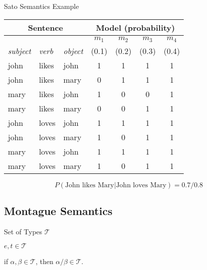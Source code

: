 \documentclass{beamer}
\newlength{\wideitemsep}
\let\olditem\item
\renewcommand{\item}{\setlength{\itemsep}{\wideitemsep}\olditem}
\begin{document}
\begin{frame}{Sato Semantics Example}
\begin{center}
\begin{tabular}{|l|l|l||c|c|c|c|}
\hline
\multicolumn{3}{|c||}{Sentence} & \multicolumn{4}{c|}{Model (probability)}\\
\hline
& & & $m_1$& $m_2$& $m_3$& $m_4$\\
\emph{subject} & \emph{verb} & \emph{object} & (0.1)& (0.2)& (0.3)& (0.4)\\
\hline
john & likes & john & 1 & 1 & 1 & 1\\
john & likes & mary & 0 & 1 & 1 & 1\\
mary & likes & john & 1 & 0 & 0 & 1\\
mary & likes & mary & 0 & 0 & 1 & 1\\
john & loves & john & 1 & 1 & 1 & 1\\
john & loves & mary & 1 & 0 & 1 & 1\\
mary & loves & john & 1 & 1 & 1 & 1\\
mary & loves & mary & 1 & 0 & 1 & 1\\
\hline
\end{tabular}
\end{center}
$$P(\text{John likes Mary}|\text{John loves Mary}) = 0.7/0.8 $$
\end{frame}


\subsection{Montague Semantics}


\begin{frame}{Set of Types $\mathcal{T}$}
\begin{description}
\item [Basic types:] $e,t\in \mathcal{T}$
\item[Complex types:]  if $\alpha, \beta\in \mathcal{T}$, then $\alpha/\beta\in \mathcal{T}$.
\end{description}
\end{frame}
\end{document}

